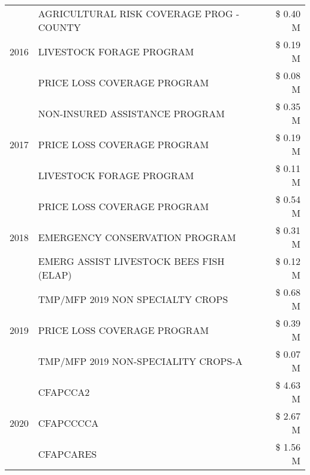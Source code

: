 \begin{tabular}{llr}
\cline{1-3}
\multirow[t]{3}{*}{2016} & AGRICULTURAL RISK COVERAGE PROG - COUNTY & \$ 0.40 M \\
 & LIVESTOCK FORAGE PROGRAM & \$ 0.19 M \\
 & PRICE LOSS COVERAGE PROGRAM & \$ 0.08 M \\
\cline{1-3}
\multirow[t]{3}{*}{2017} & NON-INSURED ASSISTANCE PROGRAM & \$ 0.35 M \\
 & PRICE LOSS COVERAGE PROGRAM & \$ 0.19 M \\
 & LIVESTOCK FORAGE PROGRAM & \$ 0.11 M \\
\cline{1-3}
\multirow[t]{3}{*}{2018} & PRICE LOSS COVERAGE PROGRAM & \$ 0.54 M \\
 & EMERGENCY CONSERVATION PROGRAM & \$ 0.31 M \\
 & EMERG ASSIST LIVESTOCK BEES FISH (ELAP) & \$ 0.12 M \\
\cline{1-3}
\multirow[t]{3}{*}{2019} & TMP/MFP 2019 NON SPECIALTY CROPS & \$ 0.68 M \\
 & PRICE LOSS COVERAGE PROGRAM & \$ 0.39 M \\
 & TMP/MFP 2019 NON-SPECIALITY CROPS-A & \$ 0.07 M \\
\cline{1-3}
\multirow[t]{3}{*}{2020} & CFAPCCA2 & \$ 4.63 M \\
 & CFAPCCCCA & \$ 2.67 M \\
 & CFAPCARES & \$ 1.56 M \\
\cline{1-3}
\bottomrule
\end{tabular}
